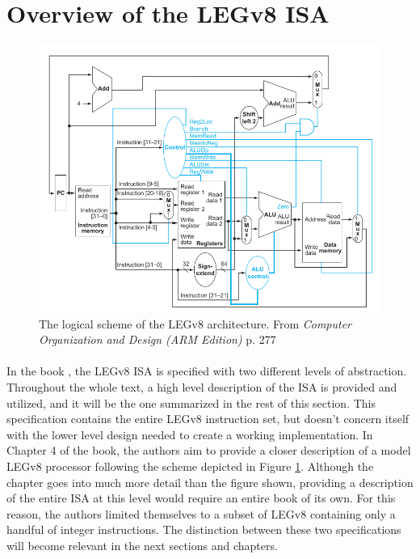 \section{Overview of the LEGv8 ISA}

\begin{figure}[H]
	\centering
	\includegraphics[width=1\textwidth]{img/legv8_logical_scheme.png}
	\caption{The logical scheme of the LEGv8 architecture. From \emph{Computer Organization and Design (ARM Edition)} \cite{patterson2016computer} p. 277}
 \label{fig:legv8logicdiag}
\end{figure}

\paragraph{}
In the book \cite{patterson2016computer}, the LEGv8 ISA is specified with two different levels of abstraction. Throughout the whole text, a high level description of the ISA is provided and utilized, and it will be the one summarized in the rest of this section. This specification contains the entire LEGv8 instruction set, but doesn't concern itself with the lower level design needed to create a working implementation. In Chapter 4 of the book, the authors aim to provide a closer description of a model LEGv8 processor following the scheme depicted in Figure \ref{fig:legv8logicdiag}. Although the chapter goes into much more detail than the figure shown, providing a description of the entire ISA at this level would require an entire book of its own. For this reason, the authors limited themselves to a subset of LEGv8 containing only a handful of integer instructions. The distinction between these two specifications will become relevant in the next sections and chapters.


